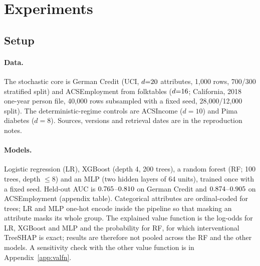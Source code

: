 \section{Experiments}
\label{sec:experiments}

\subsection{Setup}
\label{sec:setup}
\paragraph{Data.} The stochastic core is German Credit (UCI, $d{=}20$ attributes, 1{,}000 rows, 700/300 stratified split) and ACSEmployment from folktables \citep{ding2021retiring} ($d{=}16$; California, 2018 one-year person file, 40{,}000 rows subsampled with a fixed seed, 28{,}000/12{,}000 split). The deterministic-regime controls are ACSIncome ($d{=}10$) and Pima diabetes ($d{=}8$). Sources, versions and retrieval dates are in the reproduction notes.

\paragraph{Models.} Logistic regression (LR), XGBoost (depth 4, 200 trees), a random forest (RF; 100 trees, depth $\le8$) and an MLP (two hidden layers of 64 units), trained once with a fixed seed. Held-out AUC is $0.765$--$0.810$ on German Credit and $0.874$--$0.905$ on ACSEmployment (appendix table). Categorical attributes are ordinal-coded for trees; LR and MLP one-hot encode inside the pipeline so that masking an attribute masks its whole group. The explained value function is the log-odds for LR, XGBoost and MLP and the probability for RF, for which interventional TreeSHAP is exact; results are therefore not pooled across the RF and the other models. A sensitivity check with the other value function is in Appendix~\ref{app:valfn}.

